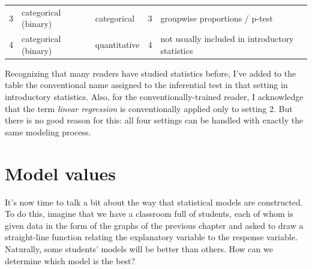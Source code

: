\documentclass[]{book}
\begin{document}
\begin{longtable}[]{@{}lllll@{}}
\begin{minipage}[t]{0.03\columnwidth}\raggedright
3\strut
\end{minipage} & \begin{minipage}[t]{0.24\columnwidth}\raggedright
categorical (binary)\strut
\end{minipage} & \begin{minipage}[t]{0.29\columnwidth}\raggedright
categorical\strut
\end{minipage} & \begin{minipage}[t]{0.15\columnwidth}\raggedright
3\strut
\end{minipage} & \begin{minipage}[t]{0.14\columnwidth}\raggedright
groupwise proportions / p-test\strut
\end{minipage}\tabularnewline
\begin{minipage}[t]{0.03\columnwidth}\raggedright
4\strut
\end{minipage} & \begin{minipage}[t]{0.24\columnwidth}\raggedright
categorical (binary)\strut
\end{minipage} & \begin{minipage}[t]{0.29\columnwidth}\raggedright
quantitative\strut
\end{minipage} & \begin{minipage}[t]{0.15\columnwidth}\raggedright
4\strut
\end{minipage} & \begin{minipage}[t]{0.14\columnwidth}\raggedright
not usually included in introductory statistics\strut
\end{minipage}\tabularnewline
\bottomrule
\end{longtable}

Recognizing that many readers have studied statistics before, I've added to the table the conventional name assigned to the inferential test in that setting in introductory statistics. Also, for the conventionally-trained reader, I acknowledge that the term \emph{linear regression} is conventionally applied only to setting 2. But there is no good reason for this: all four settings can be handled with exactly the same modeling process.

\hypertarget{model-values}{%
\chapter{Model values}\label{model-values}}

It's now time to talk a bit about the way that statistical models are constructed. To do this, imagine that we have a classroom full of students, each of whom is given data in the form of the graphs of the previous chapter and asked to draw a straight-line function relating the explanatory variable to the response variable. Naturally, some students' models will be better than others. How can we determine which model is the best?
\end{document}
